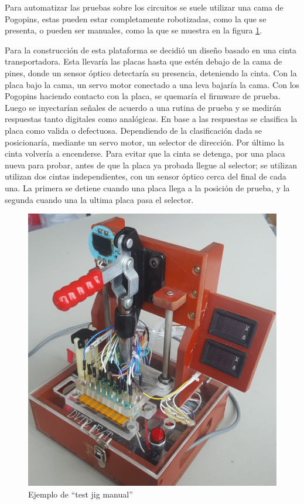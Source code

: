 \documentclass[12pt,letterpaper]{article}     %
\begin{document}
Para automatizar las pruebas sobre los circuitos se suele utilizar una cama de Pogopins, 
estas pueden estar completamente robotizadas, como la que se presenta, o pueden ser manuales,
como la que se muestra en la figura \ref{fig:pogojig}.

Para la construcción de esta plataforma se decidió un diseño basado en una cinta transportadora.
Esta llevaría las placas hasta que estén debajo de la cama de pines, donde un sensor óptico detectaría 
su presencia, deteniendo la cinta. Con la placa bajo la cama, un servo motor conectado a una leva 
bajaría la cama. Con los Pogopins haciendo contacto con la placa, se quemaría el firmware de prueba.
Luego se inyectarían señales de acuerdo a una rutina de prueba y se medirán respuestas tanto digitales
como analógicas. En base a las respuestas se clasifica la placa como valida o defectuosa. Dependiendo 
de la clasificación dada se posicionaría, mediante un servo motor, un selector de dirección. Por último
la cinta volvería a encenderse. Para evitar que la cinta se detenga, por una placa nueva para probar,
antes de que la placa ya probada llegue al selector; se utilizan utilizan dos cintas independientes, 
con un sensor óptico cerca del final de cada una. La primera se detiene cuando una placa llega a la
posición de prueba, y la segunda cuando una la ultima placa pasa el selector.

\begin{figure}[!ht]
\centering
\includegraphics[scale=0.1]{imagenes/pogojig.jpg}
\caption{Ejemplo de ``test jig manual''}
\label{fig:pogojig}
\end{figure}
\end{document}

